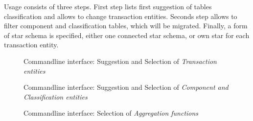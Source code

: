 Usage consists of three steps.
First step lists first suggestion of tables classification and allows to change transaction entities.
Seconds step allows to filter component and classification tables, which will be migrated.
Finally, a form of star schema is specified, either one connected star schema, or own star for each transaction entity.

\begin{figure}[p]
  
  \caption{Commandline interface: Suggestion and Selection of \emph{Transaction entities}}
  \label{fig:transactionSuggestion}
\end{figure}

\begin{figure}[p]
  
  \caption{Commandline interface: Suggestion and Selection of \emph{Component and Classification entities}}
  \label{fig:dimensionalModelSuggestion}
\end{figure}

\begin{figure}[p]
  
  \caption{Commandline interface: Selection of \emph{Aggregation functions}}
  \label{fig:aggregationSelection}
\end{figure}

